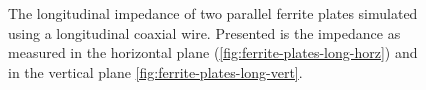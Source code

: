\begin{figure}
\caption{The longitudinal impedance of two parallel ferrite plates simulated using a longitudinal coaxial wire. Presented is the impedance as measured in the horizontal plane (\ref{fig:ferrite-plates-long-horz}) and in the vertical plane \ref{fig:ferrite-plates-long-vert}.}
\label{fig:ferrite-plates-long}
\end{figure}

